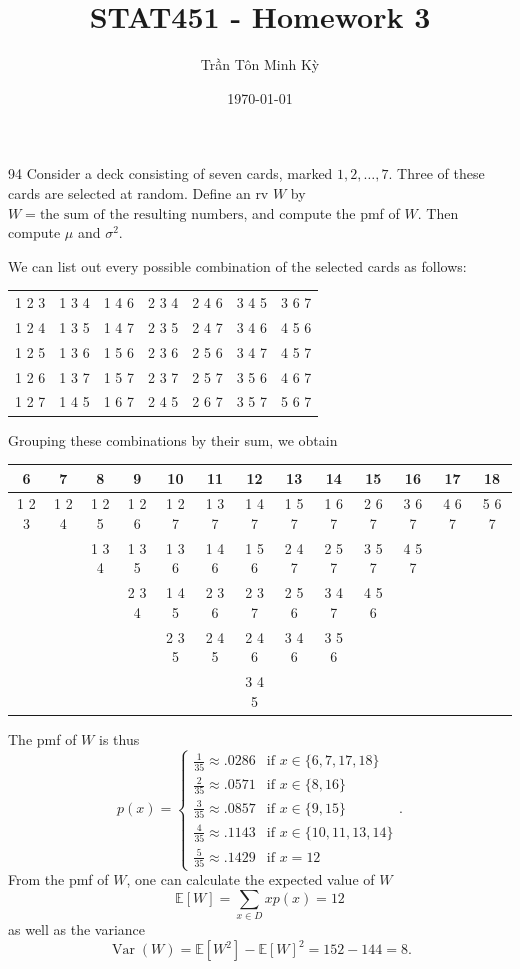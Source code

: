 \documentclass{exam}
\title{STAT451 - Homework 3}
\author{\foreignlanguage{vietnamese}{Trần Tôn Minh Kỳ}}
\date{\today}
\DeclareMathOperator{\Var}{Var}
\begin{document}
\maketitle
\begin{problem}{94}
	Consider a deck consisting of seven cards, marked $1, 2, \dots, 7$. Three of these cards are selected at random. Define an rv $W$ by $W = \text{the sum of the resulting numbers}$, and compute the pmf of $W$. Then compute $\mu$ and $\sigma^2$.
\end{problem}

We can list out every possible combination of the selected cards as follows:
\begin{center}
	\begin{tabular}{ccccccc}
		1 2 3 & 1 3 4 & 1 4 6 & 2 3 4 & 2 4 6 & 3 4 5 & 3 6 7 \\
		1 2 4 & 1 3 5 & 1 4 7 & 2 3 5 & 2 4 7 & 3 4 6 & 4 5 6 \\
		1 2 5 & 1 3 6 & 1 5 6 & 2 3 6 & 2 5 6 & 3 4 7 & 4 5 7 \\
		1 2 6 & 1 3 7 & 1 5 7 & 2 3 7 & 2 5 7 & 3 5 6 & 4 6 7 \\
		1 2 7 & 1 4 5 & 1 6 7 & 2 4 5 & 2 6 7 & 3 5 7 & 5 6 7
	\end{tabular}
\end{center}
Grouping these combinations by their sum, we obtain
\begin{center}
	\begin{tabular}{ccccccccccccc}
		6 & 7 & 8 & 9 & 10 & 11 & 12 & 13 & 14 & 15 & 16 & 17 & 18 \\
		\hline
		1 2 3 & 1 2 4 & 1 2 5 & 1 2 6 & 1 2 7 & 1 3 7 & 1 4 7 & 1 5 7 & 1 6 7 & 2 6 7 & 3 6 7 & 4 6 7 & 5 6 7 \\
		{} & {} & 1 3 4 & 1 3 5 & 1 3 6 & 1 4 6 & 1 5 6 & 2 4 7 & 2 5 7 & 3 5 7 & 4 5 7 \\
		{} & {} & {} & 2 3 4 & 1 4 5 & 2 3 6 & 2 3 7 & 2 5 6 & 3 4 7 & 4 5 6 \\
		{} & {} & {} & {} & 2 3 5 & 2 4 5 & 2 4 6 & 3 4 6 & 3 5 6 \\
		{} & {} & {} & {} & {} & {} & 3 4 5
	\end{tabular}
\end{center}
The pmf of $W$ is thus
\[
	p(x) = \begin{cases}
		\frac1{35} \approx .0286 & \text{if } x \in \{6, 7, 17, 18\} \\
		\frac2{35} \approx .0571 & \text{if } x \in \{8, 16\} \\
		\frac3{35} \approx .0857 & \text{if } x \in \{9, 15\} \\
		\frac4{35} \approx .1143 & \text{if } x \in \{10, 11, 13, 14\} \\
		\frac5{35} \approx .1429 & \text{if } x = 12
	\end{cases}.
\]
From the pmf of $W$, one can calculate the expected value of $W$
\[
	\mathbb E[W] = \sum_{x \in D} xp(x) = 12
\]
as well as the variance
\[
	\Var(W) = \mathbb E[W^2] - \mathbb E[W]^2 = 152 - 144 = 8.
\]
\end{document}
